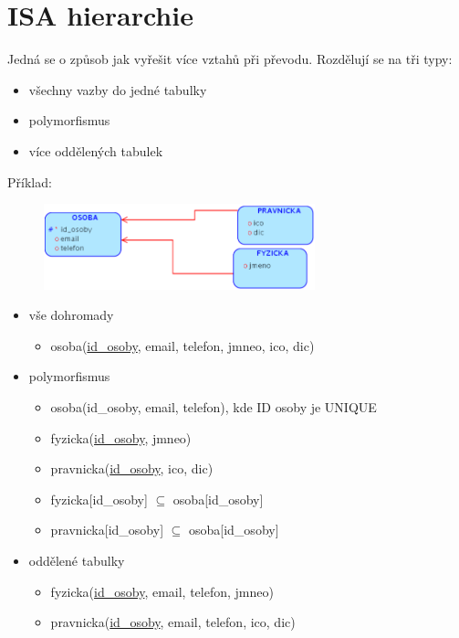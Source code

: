 \documentclass{szzclass}
\begin{document}
\section{ISA hierarchie}
Jedná se o způsob jak vyřešit více vztahů při převodu.
Rozdělují se na tři typy:
\begin{itemize}
    \item všechny vazby do jedné tabulky
    \item polymorfismus
    \item více oddělených tabulek
\end{itemize}
Příklad:
\begin{figure}[h!]
    \centering
    \includegraphics[width=0.7\textwidth]{topics/bi-wsi-si-02/images/isa.png}
\end{figure}
\begin{itemize}
    \item vše dohromady
    \begin{itemize}
        \item osoba(\underline{id\_osoby}, email, telefon, jmneo, ico, dic)
    \end{itemize}
    \item polymorfismus
    \begin{itemize}
        \item osoba(id\_osoby, email, telefon), kde ID osoby je UNIQUE
        \item fyzicka(\underline{id\_osoby}, jmneo)
        \item pravnicka(\underline{id\_osoby}, ico, dic)
        \item fyzicka[id\_osoby] $\subseteq$ osoba[id\_osoby]
        \item pravnicka[id\_osoby] $\subseteq$ osoba[id\_osoby]
    \end{itemize}
    \item oddělené tabulky
    \begin{itemize}
        \item fyzicka(\underline{id\_osoby}, email, telefon, jmneo)
        \item pravnicka(\underline{id\_osoby}, email, telefon, ico, dic)
    \end{itemize}
\end{itemize}
\end{document}
